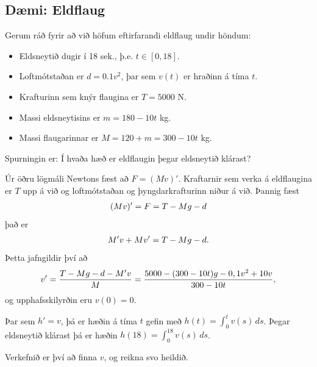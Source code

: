 \documentclass[a4paper,10pt,icelandic]{sphinxmanual}
\begin{document}
\subsection{Dæmi: Eldflaug}
\label{kafli01:daemi-eldflaug}
Gerum ráð fyrir að við höfum eftirfarandi eldflaug undir höndum:
\begin{itemize}
\item {} 
Eldsneytið dugir í 18 sek., þ.e. \(t\in [0,18]\).

\item {} 
Loftmótstaðan er \(d=0.1v^2\), þar sem \(v(t)\) er hraðinn á tíma \(t\).

\item {} 
Krafturinn sem knýr flaugina er \(T=5000\) N.

\item {} 
Massi eldsneytisins er \(m=180-10t\) kg.

\item {} 
Massi flaugarinnar er \(M = 120 + m = 300 - 10t\) kg.

\end{itemize}

Spurningin er: Í hvaða hæð er eldflaugin þegar eldsneytið klárast?

Úr öðru lögmáli Newtons fæst að \(F = (Mv)'\). Kraftarnir sem verka
á eldflaugina er \(T\) upp á við og loftmótstaðan og
þyngdarkrafturinn niður á við. Þannig fæst
\begin{gather}
\begin{split}(Mv)' = F = T - Mg - d\end{split}\notag
\end{gather}
það er
\begin{gather}
\begin{split}M'v + Mv' = T - Mg -d.\end{split}\notag
\end{gather}
Þetta jafngildir því að
\label{kafli01:eldflaug}\begin{gather}
\begin{split}v' = \frac{T-Mg-d-M'v}{M} = \frac{5000-(300-10t)g-0,1v^2+10v}{300-10t},
\label{eldflaug}\end{split}\notag
\end{gather}
og upphafsskilyrðin eru \(v(0) =0\).

Þar sem \(h' = v\), þá er hæðin á tíma \(t\) gefin með
\(h(t) =\int_0^t v(s)\, ds\). Þegar eldsneytið klárast þá er hæðin
\(h(18) = \int_0^{18} v(s)\, ds\).

Verkefnið er því að finna \(v\), og reikna svo heildið.
\end{document}
